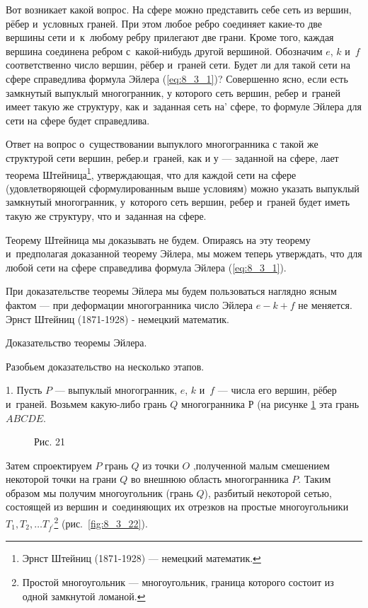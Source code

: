 Вот возникает какой вопрос. На сфере можно представить себе сеть из вершин,
рёбер и~условных граней.
При этом любое ребро соединяет какие-то две вершины сети и~к~любому ребру
прилегают две грани. Кроме того, каждая вершина соединена ребром с~какой-нибудь
другой вершиной. Обозначим $e$, $k$ и~$f$ соответственно число вершин, рёбер
и~граней сети. Будет ли для такой сети на сфере справедлива формула Эйлера
(\ref{eq:8_3_1})? Совершенно ясно, если есть замкнутый выпуклый многогранник,
у которого сеть вершин, ребер и~граней имеет такую же структуру, как и~заданная
сеть на’ сфере, то формуле Эйлера для сети на сфере будет справедлива.

Ответ на вопрос о~существовании выпуклого многогранника с такой же структурой
сети вершин, ребер.и~граней, как и у --- заданной на сфере, лает теорема
Штейница\footnote{Эрнст Штейниц (1871-1928) --- немецкий математик.},
утверждающая, что для каждой сети на сфере (удовлетворяющей
сформулированным выше условиям) можно указать выпуклый замкнутый многогранник,
у~которого сеть вершин, ребер и~граней будет иметь такую же структуру,
что и~заданная на сфере.

Теорему Штейница мы доказывать не будем. Опираясь на эту теорему и~предполагая
доказанной теорему Эйлера, мы можем теперь утверждать, что для любой сети
на сфере справедлива формула Эйлера (\ref{eq:8_3_1}).

При доказательстве теоремы Эйлера мы будем пользоваться наглядно ясным
фактом --- при деформации многогранника число Эйлера $e -k + f$ не меняется.
Эрнст Штейниц (1871-1928) - немецкий математик.


Доказательство теоремы Эйлера.

Разобьем доказательство на несколько этапов.

1. Пусть $P$ --- выпуклый многогранник, $e$, $k$ и~$f$ --- числа его вершин,
рёбер и~граней. Возьмем какую-либо грань $Q$ многогранника Р (на рисунке
\ref{fig:8_3_21} эта грань $ABCDE$.

\begin{figure}\label{fig:8_3_21}
\caption{Рис. 21}
\end{figure}

Затем спроектируем $P$ грань $Q$ из точки $O$ ‚полученной малым смешением
некоторой точки на грани $Q$ во внешнюю область многогранника $P$.
Таким образом мы получим многоугольник (грань $Q$), разбитый некоторой сетью,
состоящей из вершин и~соединяющих их отрезков на простые многоугольники
$T_{1}, T_{2}, \dots T_{f^{\prime}}$\footnote{
Простой многоугольник --- многоугольник, граница которого состоит из одной
замкнутой ломаной.}
(рис.\ \ref{fig:8_3_22}).

